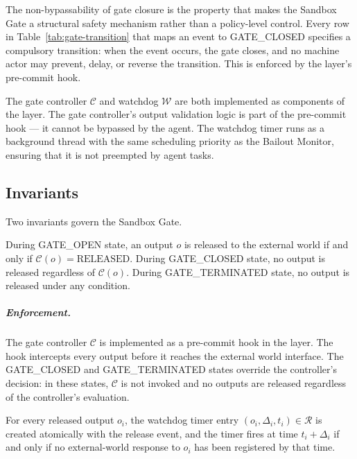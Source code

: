 The non-bypassability of gate closure is the property that makes the Sandbox Gate a structural safety mechanism rather than a policy-level control. Every row in Table~\ref{tab:gate-transition} that maps an event to GATE\_CLOSED specifies a compulsory transition: when the event occurs, the gate closes, and no machine actor may prevent, delay, or reverse the transition. This is enforced by the \fact{} layer's pre-commit hook.

The gate controller $\mathcal{C}$ and watchdog $\mathcal{W}$ are both implemented as components of the \fact{} layer. The gate controller's output validation logic is part of the pre-commit hook — it cannot be bypassed by the agent. The watchdog timer runs as a background thread with the same scheduling priority as the Bailout Monitor, ensuring that it is not preempted by agent tasks.

\subsection{Invariants}\label{sec:sandbox-invariants}

Two invariants govern the Sandbox Gate.

\begin{invariant}\label{inv:output-containment}
During GATE\_OPEN state, an output $o$ is released to the external world if and only if $\mathcal{C}(o) = \text{RELEASED}$. During GATE\_CLOSED state, no output is released regardless of $\mathcal{C}(o)$. During GATE\_TERMINATED state, no output is released under any condition.
\end{invariant}

\subparagraph{Enforcement.} The gate controller $\mathcal{C}$ is implemented as a pre-commit hook in the \fact{} layer. The hook intercepts every output before it reaches the external world interface. The GATE\_CLOSED and GATE\_TERMINATED states override the controller's decision: in these states, $\mathcal{C}$ is not invoked and no outputs are released regardless of the controller's evaluation.

\begin{invariant}\label{inv:watchdog-liveness}
For every released output $o_i$, the watchdog timer entry $(o_i, \Delta_i, t_i) \in \mathcal{R}$ is created atomically with the release event, and the timer fires at time $t_i + \Delta_i$ if and only if no external-world response to $o_i$ has been registered by that time.
\end{invariant}

